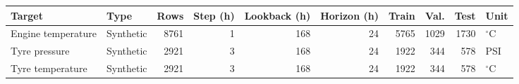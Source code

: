 \begin{tabular}{llrrrrrrrl}
\toprule
Target & Type & Rows & Step (h) & Lookback (h) & Horizon (h) & Train & Val. & Test & Unit \\
\midrule
Engine temperature & Synthetic & 8761 & 1 & 168 & 24 & 5765 & 1029 & 1730 & $^\circ$C \\
Tyre pressure & Synthetic & 2921 & 3 & 168 & 24 & 1922 & 344 & 578 & PSI \\
Tyre temperature & Synthetic & 2921 & 3 & 168 & 24 & 1922 & 344 & 578 & $^\circ$C \\
\bottomrule
\end{tabular}
